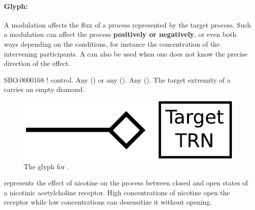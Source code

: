 \paragraph{Glyph: }\label{sec:modulation}

A modulation affects the flux of a process
represented by the target process. Such a modulation can affect the
process \textbf{positively or negatively}, or even both ways depending on the
conditions, for instance the concentration of the intervening
participants. A  can also be used when one does not know the precise direction of the effect.

\begin{glyphDescription}
 \glyphSboTerm SBO:0000168 ! control.
 \glyphOrigin Any  () or any  ().
 \glyphTarget Any  ().
 \glyphEndPoint The target extremity of a  carries an empty diamond.
 \end{glyphDescription}

\begin{figure}[H]
  \centering
  \includegraphics[scale = 0.5]{images/modulation}
  \caption{The \PD glyph for .}
  \label{fig:modulation}
\end{figure}

 represents the effect of nicotine on the process between closed and open states of a nicotinic acetylcholine receptor. High concentrations of nicotine open the receptor while low concentrations can desensitize it without opening. 

